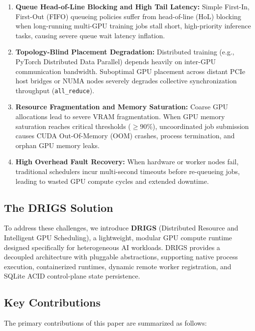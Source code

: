 \begin{enumerate}
    \item \textbf{Queue Head-of-Line Blocking and High Tail Latency:} Simple First-In, First-Out (FIFO) queueing policies suffer from head-of-line (HoL) blocking when long-running multi-GPU training jobs stall short, high-priority inference tasks, causing severe queue wait latency inflation.
    \item \textbf{Topology-Blind Placement Degradation:} Distributed training (e.g., PyTorch Distributed Data Parallel) depends heavily on inter-GPU communication bandwidth. Suboptimal GPU placement across distant PCIe host bridges or NUMA nodes severely degrades collective synchronization throughput (\texttt{all\_reduce}).
    \item \textbf{Resource Fragmentation and Memory Saturation:} Coarse GPU allocations lead to severe VRAM fragmentation. When GPU memory saturation reaches critical thresholds ($\ge 90\%$), uncoordinated job submission causes CUDA Out-Of-Memory (OOM) crashes, process termination, and orphan GPU memory leaks.
    \item \textbf{High Overhead Fault Recovery:} When hardware or worker nodes fail, traditional schedulers incur multi-second timeouts before re-queueing jobs, leading to wasted GPU compute cycles and extended downtime.
\end{enumerate}

\subsection{The DRIGS Solution}
To address these challenges, we introduce \textbf{DRIGS} (Distributed Resource and Intelligent GPU Scheduling), a lightweight, modular GPU compute runtime designed specifically for heterogeneous AI workloads. DRIGS provides a decoupled architecture with pluggable abstractions, supporting native process execution, containerized runtimes, dynamic remote worker registration, and SQLite ACID control-plane state persistence.

\subsection{Key Contributions}
The primary contributions of this paper are summarized as follows:

